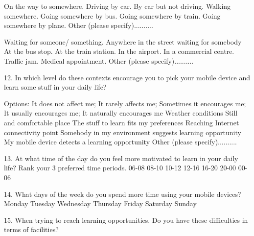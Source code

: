 \begin{small}
On the way to somewhere.
\hfill \break {}  Driving by car.					
\hfill \break {}  By car but not driving.					
\hfill \break {}  Walking somewhere.					
\hfill \break {}  Going somewhere by bus.					
\hfill \break {}  Going somewhere by train.					
\hfill \break {}  Going somewhere by plane.					
\hfill \break {}  Other (please specify)..........					

Waiting for someone/ something.
\hfill \break {}  Anywhere in the street waiting for somebody					
\hfill \break {}  At the bus stop.					
\hfill \break {}  At the train station.					
\hfill \break {}  In the airport.					
\hfill \break {}  In a commercial centre.					
\hfill \break {}  Traffic jam.					
\hfill \break {}  Medical appointment.					
\hfill \break {}  Other (please specify)..........					


12. In which level do these contexts encourage you to pick your mobile device and learn some stuff in your daily life? 

Options: It does not affect me; It rarely affects me; Sometimes it encourages me; It usually encourages me; It naturally encourages me
\hfill \break {}  Weather conditions					
\hfill \break {}  Still and comfortable place					
\hfill \break {}  The stuff to learn fits my preferences					
\hfill \break {}  Reaching Internet connectivity point					
\hfill \break {}  Somebody in my environment suggests learning opportunity					
\hfill \break {}  My mobile device detects a learning opportunity					
\hfill \break {}  Other (please specify)..........					


13. At what time of the day do you feel more motivated to learn in your daily life? Rank your 3 preferred time periods.
\hfill \break {}  06-08
\hfill \break {}  08-10
\hfill \break {}  10-12
\hfill \break {}  12-16
\hfill \break {}  16-20
\hfill \break {}  20-00
\hfill \break {}  00-06


14. What days of the week do you spend more time using your mobile devices?
\hfill \break {}  Monday
\hfill \break {}  Tuesday
\hfill \break {}  Wednesday
\hfill \break {}  Thursday
\hfill \break {}  Friday
\hfill \break {}  Saturday
\hfill \break {}  Sunday


15. When trying to reach learning opportunities. Do you have these difficulties in terms of facilities? 


\end{small}
